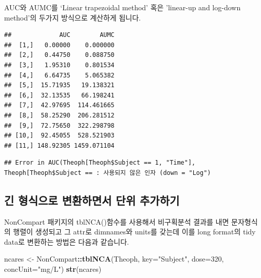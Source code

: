\documentclass[]{krantz}
\makeatletter
\newenvironment{Shaded}{\begin{snugshade}}{\end{snugshade}}
\newcommand{\KeywordTok}[1]{\textcolor[rgb]{0.13,0.29,0.53}{\textbf{#1}}}
\newcommand{\DataTypeTok}[1]{\textcolor[rgb]{0.13,0.29,0.53}{#1}}
\newcommand{\DecValTok}[1]{\textcolor[rgb]{0.00,0.00,0.81}{#1}}
\newcommand{\StringTok}[1]{\textcolor[rgb]{0.31,0.60,0.02}{#1}}
\newcommand{\OperatorTok}[1]{\textcolor[rgb]{0.81,0.36,0.00}{\textbf{#1}}}
\newcommand{\NormalTok}[1]{#1}
\newenvironment{kframe}{%
\medskip{}
\setlength{\fboxsep}{.8em}
 \def\at@end@of@kframe{}%
 \ifinner\ifhmode%
  \def\at@end@of@kframe{\end{minipage}}%
  \begin{minipage}{\columnwidth}%
 \fi\fi%
 \def\FrameCommand##1{\hskip\@totalleftmargin \hskip-\fboxsep
 \colorbox{shadecolor}{##1}\hskip-\fboxsep
     \hskip-\linewidth \hskip-\@totalleftmargin \hskip\columnwidth}%
 \MakeFramed {\advance\hsize-\width
   \@totalleftmargin\z@ \linewidth\hsize
   \@setminipage}}%
 {\par\unskip\endMakeFramed%
 \at@end@of@kframe}
\renewenvironment{Shaded}{\begin{kframe}}{\end{kframe}}
\theoremstyle{definition}
\theoremstyle{definition}
\theoremstyle{definition}
\theoremstyle{remark}
\makeatother
\begin{document}
AUC와 AUMC를 `Linear trapezoidal method' 혹은 'linear-up and log-down
method'의 두가지 방식으로 계산하게 됩니다.

\begin{Shaded}
\end{Shaded}

\begin{verbatim}
##             AUC        AUMC
##  [1,]   0.00000    0.000000
##  [2,]   0.44750    0.088750
##  [3,]   1.95310    0.801534
##  [4,]   6.64735    5.065382
##  [5,]  15.71935   19.138321
##  [6,]  32.13535   66.198241
##  [7,]  42.97695  114.461665
##  [8,]  58.25290  206.281512
##  [9,]  72.75650  322.298798
## [10,]  92.45055  528.521903
## [11,] 148.92305 1459.071104
\end{verbatim}

\begin{Shaded}
\end{Shaded}

\begin{verbatim}
## Error in AUC(Theoph[Theoph$Subject == 1, "Time"], Theoph[Theoph$Subject == : 사용되지 않은 인자 (down = "Log")
\end{verbatim}

\subsection{긴 형식으로 변환하면서 단위 추가하기}\label{long-format}

NonCompart 패키지의 tblNCA()함수를 사용해서 비구획분석 결과를 내면
문자형식의 행렬이 생성되고 그 attr로 dimnames와 units를 갖는데 이를 long
format의 tidy data로 변환하는 방법은 다음과 같습니다.

\begin{Shaded}
\begin{Highlighting}[]
\NormalTok{ncares <-}\StringTok{ }\NormalTok{NonCompart}\OperatorTok{::}\KeywordTok{tblNCA}\NormalTok{(Theoph, }\DataTypeTok{key=}\StringTok{"Subject"}\NormalTok{, }\DataTypeTok{dose=}\DecValTok{320}\NormalTok{, }\DataTypeTok{concUnit=}\StringTok{"mg/L"}\NormalTok{)}
\KeywordTok{str}\NormalTok{(ncares)}
\end{Highlighting}
\end{Shaded}
\end{document}
